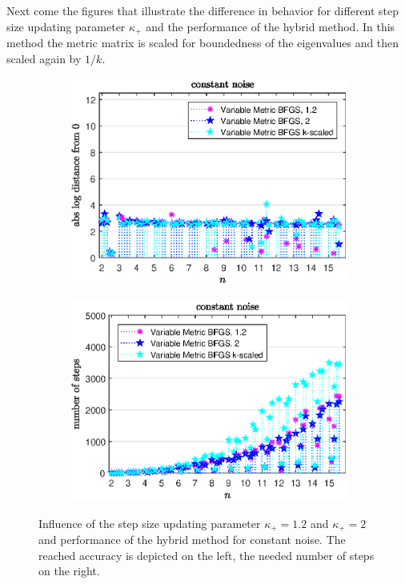 Next come the figures that illustrate the difference in behavior for different step size updating parameter \(\kappa_+\) and the performance of the hybrid method. In this method the metric matrix is scaled for boundedness of the eigenvalues and then scaled again by \(1/k\).


\begin{figure}[H]
	\begin{subfigure}{0.49\textwidth}
		\includegraphics[width=\textwidth]{Pictures/Plots/constant_noise_comp.eps}%
	\end{subfigure}
	\begin{subfigure}{0.49\textwidth}
		\includegraphics[width=\textwidth]{Pictures/Plots/steps_constant_noise_comp.eps}%
	\end{subfigure}
	\caption{Influence of the step size updating parameter \(\kappa_+ = 1.2\) and \(\kappa_+ =2 \) and performance of the hybrid method for constant noise. The reached accuracy is depicted on the left, the needed number of steps on the right.}%
	\label{fig_const_noise_comp}%
\end{figure}

